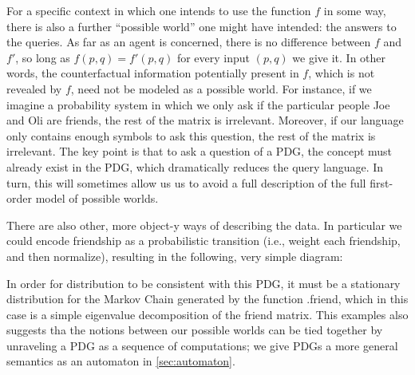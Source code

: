 \documentclass{article}
\theoremstyle{plain}
\theoremstyle{definition}
\theoremstyle{remark}
\newcommand{\var}[1]{\mathsf{#1}}
\begin{document}
\begin{example}
    For a specific context in which one intends to use the function $f$ in some way, there is also a further ``possible world'' one might have intended: the answers to the queries. As far as an agent is concerned, there is no difference between $f$ and $f'$, so long as $f(p,q) = f'(p,q)$ for every input $(p,q)$ we give it. In other words, the counterfactual information potentially present in $f$, which is not revealed by $f$, need not be modeled as a possible world. For instance, if we imagine a probability system in which we only ask if the particular people Joe and Oli are friends, the rest of the matrix is irrelevant.     
    Moreover, if our language only contains enough symbols to ask this question, the rest of the matrix is irrelevant. 
    The key point is that to ask a question of a PDG, the concept must already exist in the PDG, which dramatically reduces the query language. In turn, this will sometimes allow us us to avoid a full description of the full first-order model of possible worlds. 

    There are also other, more object-y ways of describing the data. In particular we could encode friendship as a probabilistic transition (i.e., weight each friendship, and then normalize), resulting in the following, very simple diagram:
    \begin{center}
        \hspace{1cm}
    \end{center}
    In order for distribution to be consistent with this PDG, it must be a stationary distribution for the Markov Chain generated by the function .friend, which in this case is a simple eigenvalue decomposition of the friend matrix. This examples also suggests tha the notions between our possible worlds can be tied together by unraveling a PDG as a sequence of computations; we give PDGs a more general semantics as an automaton in \cref{sec:automaton}.
\end{example}
\end{document}
